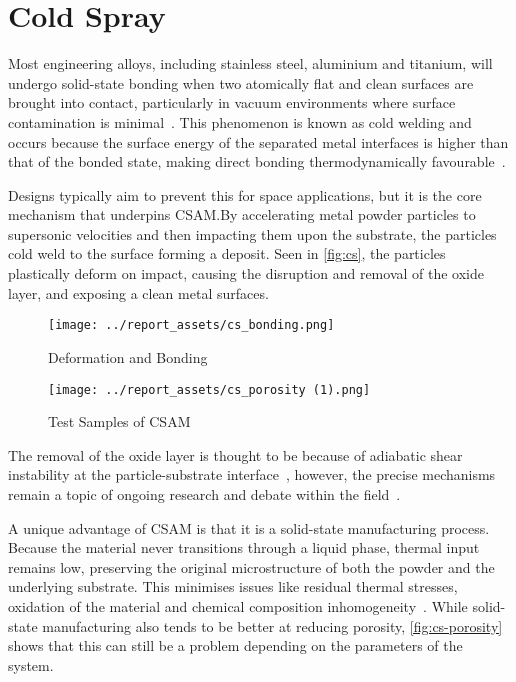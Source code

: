 
\section{Cold Spray}\label{sec:cold-spray}
Most engineering alloys, including stainless steel, aluminium and titanium, will undergo solid-state bonding when two atomically flat and clean surfaces are brought into contact, particularly in vacuum environments where surface contamination is minimal~\cite{merstallinger2009coldwelding}. 
This phenomenon is known as cold welding and occurs because the surface energy of the separated metal interfaces is higher than that of the bonded state, making direct bonding thermodynamically favourable~\cite{WagleBaker2015}. 

Designs typically aim to prevent this for space applications, but it is the core mechanism that underpins CSAM.\@ By accelerating metal powder particles to supersonic velocities and then impacting them upon the substrate, the particles cold weld to the surface forming a deposit. Seen in \autoref{fig:cs}, the particles plastically deform on impact, causing the disruption and removal of the oxide layer, and exposing a clean metal surfaces. 
\begin{figure}[htbp]
    \centering
    
    \begin{minipage}{0.45\textwidth}
        \centering
        \texttt{[image: ../report\_assets/cs\_bonding.png]}
        \caption{Deformation and Bonding~\cite{ZHANG2024137157}}\label{fig:cs}
    \end{minipage}
    \hfill
    \begin{minipage}{0.45\textwidth}
        \centering
        \texttt{[image: ../report\_assets/cs\_porosity (1).png]}
        \caption{Test Samples of CSAM~\cite{coatings13040738}}\label{fig:cs-porosity}
    \end{minipage}
    
\end{figure}
The removal of the oxide layer is thought to be because of adiabatic shear instability at the particle-substrate interface~\cite{assadi2016cold}, however, the precise mechanisms remain a topic of ongoing research and debate within the field~\cite{HASSANIGANGARAJ2018430}.

A unique advantage of CSAM is that it is a solid-state manufacturing process. Because the material never transitions through a liquid phase, thermal input remains low, preserving the original microstructure of both the powder and the underlying substrate. This minimises issues like residual thermal stresses, oxidation of the material and chemical composition inhomogeneity~\cite{ma16072765}. While solid-state manufacturing also tends to be better at reducing porosity, \autoref{fig:cs-porosity} shows that this can still be a problem depending on the parameters of the system. 

